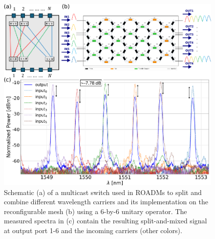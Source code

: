 \begin{figure}[h]
	\centering
	\includegraphics{figures/ch4-mcs.pdf}
	\caption{Schematic (a) of a multicast switch used in ROADMs to split and combine different wavelength carriers and its implementation on the reconfigurable mesh (b) using a 6-by-6 unitary operator.
		The measured spectra in (c) contain the resulting split-and-mixed signal at output port 1-6 and the incoming carriers (other colors).
	}
	\label{fig:multicast}
\end{figure}



